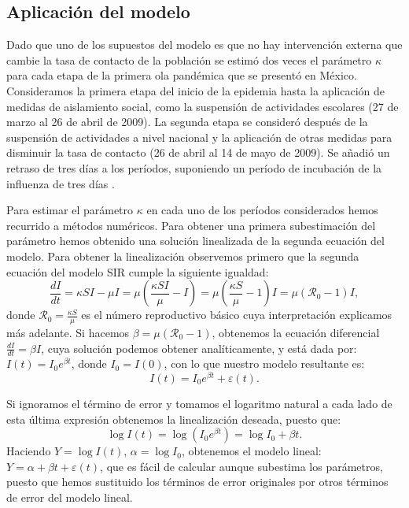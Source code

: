 \documentclass[12pt]{article}
\begin{document}
	\subsection*{Aplicación del modelo}
	
	Dado que uno de los supuestos del modelo es que no hay intervención externa que cambie la tasa de contacto de la población se estimó dos veces el parámetro $ \kappa $ para cada etapa de la primera ola pandémica que se presentó en México. Consideramos la primera etapa del inicio de la epidemia hasta la aplicación de medidas de aislamiento social, como la suspensión de actividades escolares (27 de marzo al 26 de abril de 2009). La segunda etapa se consideró después de la suspensión de actividades a nivel nacional y la aplicación de otras medidas para disminuir la tasa de contacto (26 de abril al 14 de mayo de 2009). Se añadió un retraso de tres días a los períodos, suponiendo un período de incubación de la influenza de tres días \cite{Fielding2014}.
	
	Para estimar el parámetro $ \kappa $ en cada uno de los períodos considerados hemos recurrido a métodos numéricos. Para obtener una primera subestimación del parámetro hemos obtenido una solución linealizada de la segunda ecuación del modelo. Para obtener la linealización observemos primero que la segunda ecuación del modelo SIR cumple la siguiente igualdad:
	\[ \frac{dI}{dt} = \kappa SI - \mu I = \mu\left(\frac{\kappa SI}{\mu} - I\right) = \mu\left(\frac{\kappa S}{\mu} - 1\right)I = \mu(\mathcal{R}_0 - 1)I, \tag{1} \]
	donde $ \mathcal{R}_0 = \frac{\kappa S}{\mu} $ es el número reproductivo básico cuya interpretación explicamos más adelante. Si hacemos $ \beta = \mu\left(\mathcal{R}_0 - 1\right) $, obtenemos la ecuación diferencial $ \frac{dI}{dt} = \beta I $, cuya solución podemos obtener analíticamente, y está dada por: $ I(t) = I_0e^{\beta t} $, donde $ I_0 = I(0) $, con lo que nuestro modelo resultante es:
	\[ I(t) = I_0e^{\beta t} + \varepsilon(t) . \] 
	
	Si ignoramos el término de error y tomamos el logaritmo natural a cada lado de esta última expresión obtenemos la linealización deseada, puesto que:
	\begin{equation*}
	\log I(t) = \log(I_0 e^{\beta t}) = \log I_0 + \beta t.
	\end{equation*}
	Haciendo $ Y = \log I(t) $, $ \alpha = \log I_0 $, obtenemos el modelo lineal: $ Y = \alpha + \beta t + \varepsilon(t) $, que es fácil de calcular aunque subestima los parámetros, puesto que hemos sustituido los términos de error originales por otros términos de error del modelo lineal.
	
\end{document}

